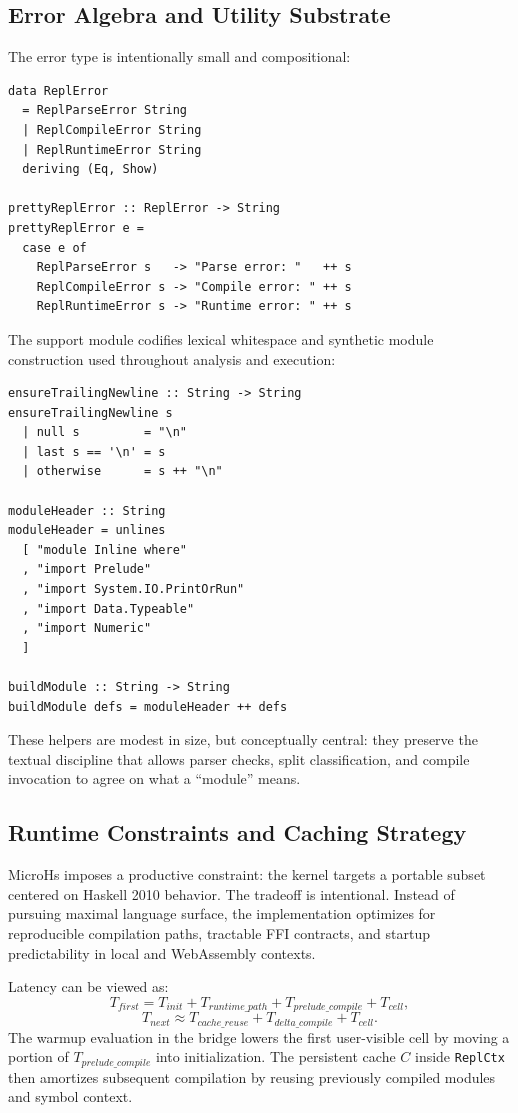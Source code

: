 \subsection{Error Algebra and Utility Substrate}

The error type is intentionally small and compositional:

\begin{verbatim}
data ReplError
  = ReplParseError String
  | ReplCompileError String
  | ReplRuntimeError String
  deriving (Eq, Show)

prettyReplError :: ReplError -> String
prettyReplError e =
  case e of
    ReplParseError s   -> "Parse error: "   ++ s
    ReplCompileError s -> "Compile error: " ++ s
    ReplRuntimeError s -> "Runtime error: " ++ s
\end{verbatim}

The support module codifies lexical whitespace and synthetic module construction used throughout analysis and execution:

\begin{verbatim}
ensureTrailingNewline :: String -> String
ensureTrailingNewline s
  | null s         = "\n"
  | last s == '\n' = s
  | otherwise      = s ++ "\n"

moduleHeader :: String
moduleHeader = unlines
  [ "module Inline where"
  , "import Prelude"
  , "import System.IO.PrintOrRun"
  , "import Data.Typeable"
  , "import Numeric"
  ]

buildModule :: String -> String
buildModule defs = moduleHeader ++ defs
\end{verbatim}

These helpers are modest in size, but conceptually central: they preserve the textual discipline that allows parser checks, split classification, and compile invocation to agree on what a ``module'' means.

\subsection{Runtime Constraints and Caching Strategy}

MicroHs imposes a productive constraint: the kernel targets a portable subset centered on Haskell 2010 behavior. The tradeoff is intentional. Instead of pursuing maximal language surface, the implementation optimizes for reproducible compilation paths, tractable FFI contracts, and startup predictability in local and WebAssembly contexts.

Latency can be viewed as:
$$
T_{first} = T_{init} + T_{runtime\_path} + T_{prelude\_compile} + T_{cell},
$$
$$
T_{next} \approx T_{cache\_reuse} + T_{delta\_compile} + T_{cell}.
$$
The warmup evaluation in the bridge lowers the first user-visible cell by moving a portion of $T_{prelude\_compile}$ into initialization. The persistent cache $C$ inside \verb|ReplCtx| then amortizes subsequent compilation by reusing previously compiled modules and symbol context.

